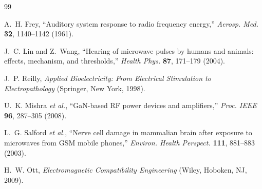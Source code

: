 \documentclass[aps,prl,twocolumn,superscriptaddress,showpacs]{revtex4-2}
\begin{document}
\begin{thebibliography}{99}

A.~H. Frey, ``Auditory system response to radio frequency energy,'' \emph{Aerosp. Med.} \textbf{32}, 1140--1142 (1961).

J.~C. Lin and Z.~Wang, ``Hearing of microwave pulses by humans and animals: effects, mechanism, and thresholds,'' \emph{Health Phys.} \textbf{87}, 171--179 (2004).

J.~P. Reilly, \emph{Applied Bioelectricity: From Electrical Stimulation to Electropathology} (Springer, New York, 1998).

U.~K. Mishra \emph{et al.}, ``GaN-based RF power devices and amplifiers,'' \emph{Proc. IEEE} \textbf{96}, 287--305 (2008).

L.~G. Salford \emph{et al.}, ``Nerve cell damage in mammalian brain after exposure to microwaves from GSM mobile phones,'' \emph{Environ. Health Perspect.} \textbf{111}, 881--883 (2003).

H.~W. Ott, \emph{Electromagnetic Compatibility Engineering} (Wiley, Hoboken, NJ, 2009).

\end{thebibliography}
\end{document}
